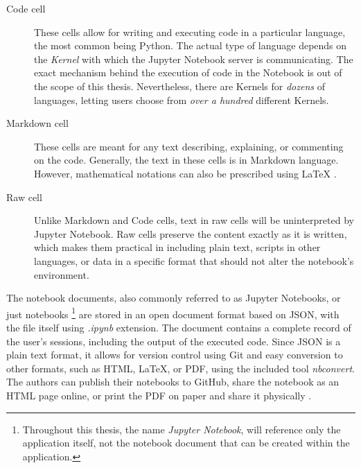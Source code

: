 \documentclass[
  digital,     %
  oneside,     %
  nosansbold,  %
  nocolorbold, %
  lof,         %
  lot,         %
]{fithesis4}
\begin{document}
\begin{description}

    \item[Code cell]
    These cells allow for writing and executing code in a particular language, the most common being Python. The actual type of language depends on the \emph{Kernel} with which the Jupyter Notebook server is communicating. The exact mechanism behind the execution of code in the Notebook is out of the scope of this thesis. Nevertheless, there are Kernels for \emph{dozens} of languages, letting users choose from \emph{over a hundred} \cite{perkel2018jupyter} different Kernels.

    \item[Markdown cell]
    These cells are meant for any text describing, explaining, or commenting on the code. Generally, the text in these cells is in Markdown language. However, mathematical notations can also be prescribed using LaTeX \cite{jupyter_notebook}. 
    
    \item[Raw cell]
    Unlike Markdown and Code cells, text in raw cells will be uninterpreted by Jupyter Notebook. Raw cells preserve the content exactly as it is written, which makes them practical in including plain text, scripts in other languages, or data in a specific format that should not alter the notebook's environment.
    
\end{description}

The notebook documents, also commonly referred to as Jupyter Notebooks, or just notebooks 
\footnote{Throughout this thesis, the name \emph{Jupyter Notebook}, will reference only the application itself, not the notebook document that can be created within the application.}
are stored in an open document format based on JSON, with the file itself using \emph{.ipynb} extension. The document contains a complete record of the user's sessions, including the output of the executed code. Since JSON is a plain text format, it allows for version control using Git and easy conversion to other formats, such as HTML, LaTeX, or PDF, using the included tool \emph{nbconvert}. The authors can publish their notebooks to GitHub, share the notebook as an HTML page online, or print the PDF on paper and share it physically \cite{kluyver2016jupyter}. 

\end{document}
